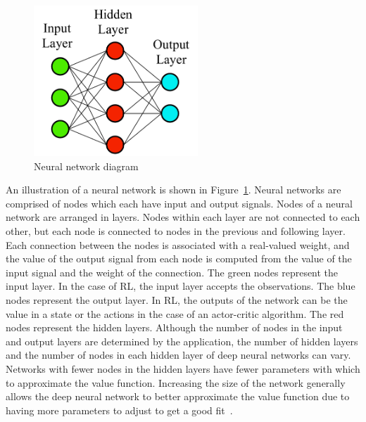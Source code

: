 %
\begin{figure}[tb]
	\begin{center}
	\includegraphics[width = 0.55\textwidth]{figures/figures_introduction/Neural_network_diagram.pdf}
	\caption{Neural network diagram} 
	\label{fig_chap1:NN_diagram}
	\end{center}
\end{figure}
%
An illustration of a neural network is shown in Figure~\ref{fig_chap1:NN_diagram}.
%
Neural networks are comprised of nodes which each have input and output signals.
%
Nodes of a neural network are arranged in layers. Nodes within each layer are not connected to each other, but each node is connected to nodes in the previous and following layer.
%
Each connection between the nodes is associated with a real-valued weight, and the value of the output signal from each node is computed from the value of the input signal and the weight of the connection.
%
The green nodes represent the input layer. In the case of RL, the input layer accepts the observations. The blue nodes represent the output layer. In RL, the outputs of the network can be the value in a state or the actions in the case of an actor-critic algorithm. The red nodes represent the hidden layers.
%
Although the number of nodes in the input and output layers are determined by the application, the number of hidden layers and the number of nodes in each hidden layer of deep neural networks can vary.
%
Networks with fewer nodes in the hidden layers have fewer parameters with which to approximate the value function. Increasing the size of the network generally allows the deep neural network to better approximate the value function due to having more parameters to adjust to get a good fit~\cite{Bengio:2009a}.



